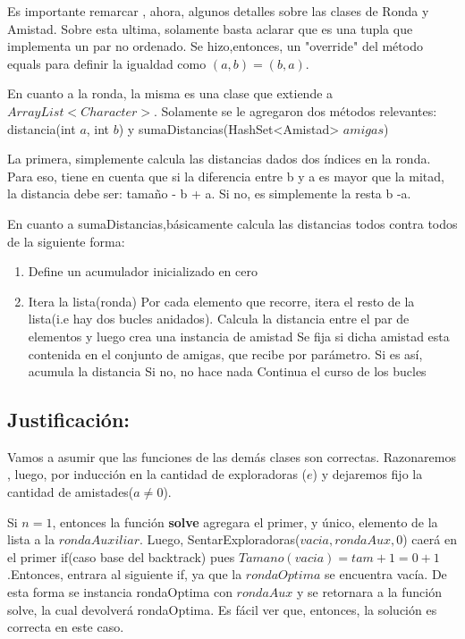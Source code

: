 \documentclass[10pt, a4paper]{article}
\begin{document}
Es importante remarcar , ahora, algunos detalles sobre las clases de Ronda y Amistad.
Sobre esta ultima, solamente basta aclarar que es una tupla que implementa un par no ordenado. Se hizo,entonces, un "override" del método equals para definir la igualdad como $(a,b) = (b,a).$

En cuanto a la ronda, la misma es una clase que extiende a $ArrayList<Character>$. Solamente se le agregaron dos métodos relevantes:
distancia(int $a$, int $b$) y sumaDistancias(HashSet<Amistad> $amigas$)

La primera, simplemente calcula las distancias dados dos índices en la ronda. Para eso, tiene en cuenta que si la diferencia entre b y a es mayor que la mitad, la distancia debe ser: tamaño - b + a. Si no, es simplemente la resta b -a.

En cuanto a sumaDistancias,básicamente calcula las distancias todos contra todos de la siguiente forma:

\begin{enumerate}
 \item Define un acumulador inicializado en cero
\item Itera la lista(ronda)
	\subitem Por cada elemento que recorre, itera el resto de la lista(i.e hay dos bucles anidados).
	\subitem Calcula la distancia entre el par de elementos y luego crea una instancia de amistad
	\subitem Se fija si dicha amistad esta contenida en el conjunto de amigas, que recibe por parámetro.
		\subitem \hspace{6mm} Si es así, acumula la distancia
		\subitem \hspace{6mm} Si no, no hace nada
	\subitem Continua el curso de los bucles
\end{enumerate}


\subsection{Justificación:}

Vamos a asumir que las funciones de las demás clases son correctas. Razonaremos , luego, por inducción en la cantidad de exploradoras ($e$) y dejaremos fijo la cantidad de amistades($a \neq 0$).

Si $n = 1$, entonces la función \textbf{solve} agregara el primer, y único, elemento de la lista a la $rondaAuxiliar$. Luego, SentarExploradoras($vacia,rondaAux,0$) caerá en el primer if(caso base del backtrack) pues $Tamano(vacia) = tam+1 = 0 +1$.Entonces, entrara al siguiente if, ya que la $rondaOptima$ se encuentra vacía. De esta forma se instancia rondaOptima con $rondaAux$ y se retornara a la función solve, la cual devolverá rondaOptima. Es fácil ver que, entonces, la solución es correcta en este caso.
\end{document}
